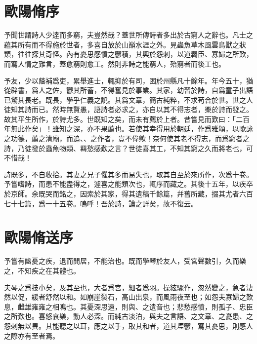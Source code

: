 \section[梅聖俞詩集序\quad{\small 歐陽脩}]{{\normalsize 歐陽脩}\quad {}序}
予聞世謂詩人少逹而多窮，夫豈然哉？蓋世所傳詩者多出於古窮人之辭也。凡士之藴其所有而不得施於世者，多喜自放於山巔水涯之外。見蟲魚草木風雲鳥獸之狀類，往往探其奇怪。內有憂思感憤之鬱積，其興於怨刺，以道羇臣、寡婦之所歎，而寫人情之難言，蓋愈窮則愈工。然則非詩之能窮人，殆窮者而後工也。

予友，少以蔭補爲吏，累舉進士，輒抑於有司，困於州縣凡十餘年。年今五十，猶從辟書，爲人之佐，鬱其所蓄，不得奮見於事業。其家，幼習於詩，自爲童子出語已驚其長老。既長，學乎仁義之說。其爲文章，簡古純粹，不求苟合於世。世之人徒知其詩而已。然時無賢愚，語詩者必求之，亦自以其不得志者，樂於詩而發之。故其平生所作，於詩尤多。世既知之矣，而未有薦於上者。昔嘗見而歎曰：「二百年無此作矣」！雖知之深，亦不果薦也。若使其幸得用於朝廷，作爲雅頌，以歌詠之功德，薦之清廟，而追、、之作者，豈不偉歟！奈何使其老不得志，而爲窮者之詩，乃徒發於蟲魚物類、羇愁感歎之言？世徒喜其工，不知其窮之久而將老也，可不惜哉！

詩既多，不自收拾。其妻之兄子懼其多而易失也，取其自至於來所作，次爲十卷。予嘗嗜詩，而患不能盡得之，遽喜之能類次也，輒序而藏之。其後十五年，以疾卒於京師。余既哭而銘之，因索於其家，得其遺稿千餘篇，幷舊所藏，掇其尤者六百七十七篇，爲一十五卷。嗚呼！吾於詩，論之詳矣，故不復云。%

\theendnotes

\section[送楊寘序\quad{\small 歐陽脩}]{{\normalsize 歐陽脩}\quad 送序}
予嘗有幽憂之疾，退而閒居，不能治也。既而學琴於友人，受宮聲數引，久而樂之，不知疾之在{其}體也。%

夫琴之爲技小矣，及其至也，大者爲宮，細者爲羽。操絃驟作，忽然變之，急者淒然以促，緩者舒然以和。如崩崖裂石，高山出泉，而風雨夜至也；如怨夫寡婦之歎息，雌雄雍雍之相鳴也。其憂深思遠，則與、之遺音也；悲愁感憤，則孤子、忠臣之所歎也。喜怒哀樂，動人必深。而純古淡泊，與夫之言語、之文章、之憂患、之怨刺無以異。其能聽之以耳，應之以手，取其和者，道其堙鬱，寫其憂思，則感人之際亦有至者焉。%

